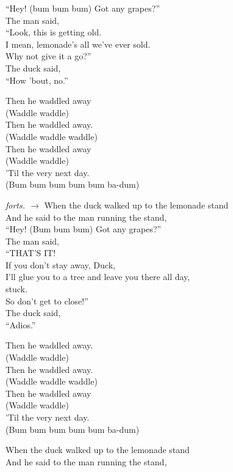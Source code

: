 ``Hey! (bum bum bum) Got any grapes?''\\
The man said,\\
``Look, this is getting old.\\
I mean, lemonade's all we've ever sold.\\
Why not give it a go?''\\
The duck said,\\
``How 'bout, no.''\par
\vspace{10pt}
Then he waddled away\\
(Waddle waddle)\\
Then he waddled away.\\
(Waddle waddle waddle)\\
Then he waddled away\\
(Waddle waddle)\\
'Til the very next day.\\
(Bum bum bum bum bum ba-dum)\par
\vfill
\hfill {\footnotesize\textit{forts. $\rightarrow$}}
\newpage
When the duck walked up to the lemonade stand\\
And he said to the man running the stand,\\
``Hey! (Bum bum bum) Got any grapes?''\\
The man said,\\
``THAT’S IT!\\
If you don't stay away, Duck,\\
I'll glue you to a tree and leave you there all day,\\
stuck.\\
So don't get to close!''\\
The duck said,\\
``Adios.''\par
\vspace{10pt}
Then he waddled away.\\
(Waddle waddle)\\
Then he waddled away.\\
(Waddle waddle waddle)\\
Then he waddled away\\
(Waddle waddle)\\
'Til the very next day.\\
(Bum bum bum bum bum ba-dum)\par
\vspace{10pt}
When the duck walked up to the lemonade stand\\
And he said to the man running the stand,\\
